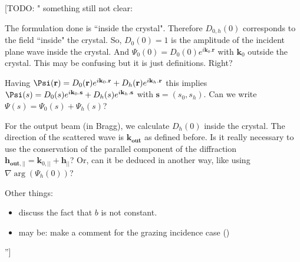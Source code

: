 \documentclass[preprint]{iucr}              %
\newcommand{\todo}[1]{{\color{red}[TODO: "#1'']}}
\newcommand{\inred}[1]{{\color{red}#1}}
\begin{document}
\todo{ something still not clear:

The formulation done is ``inside the crystal". Therefore $D_{0,h}(0)$ corresponds to the field ``inside" the crystal. So, $D_0(0)=1$ is the amplitude of the incident plane wave inside the crystal. 
And $\Psi_0(0)=D_0(0) e^{i \textbf{k}_0. \textbf{r}}$ with $\textbf{k}_0$ outside the crystal. This may be confusing but it is just definitions.  
Right? 

Having $\Psi(\textbf r) = D_0(\textbf r) e^{i \textbf k_0 . \textbf r} + D_h(\textbf r) e^{i \textbf k_h . \textbf r}$ this implies $\Psi(s) = D_0(s) e^{i \textbf k_0 . \textbf{s}} + D_h(s) e^{i \textbf k_h . \textbf s}$ with $\textbf{s}=(s_0,s_h)$. Can we write $\Psi(s)=\Psi_0(s)+\Psi_h(s)$?


For the output beam (in Bragg), we calculate $D_h(0)$ inside the crystal. The direction of the scattered wave is $\textbf{k}_{\textbf{out}}$ as defined before. 
Is it really necessary to use the conservation of the parallel component of the diffraction $\textbf{h}_{\textbf{out},||}= \textbf{k}_{0,||} + \textbf{h}_{||}$? Or, can it be deduced in another way, like using  $\nabla  \arg(\Psi_h(0))$? 

Other things: 
\begin{itemize}
    \item discuss the fact that $b$ is not constant.
    \item may be: make a comment for the grazing incidence case (\cite{Yashiro2001, Stepanov1998})
\end{itemize}
}





\end{document}
